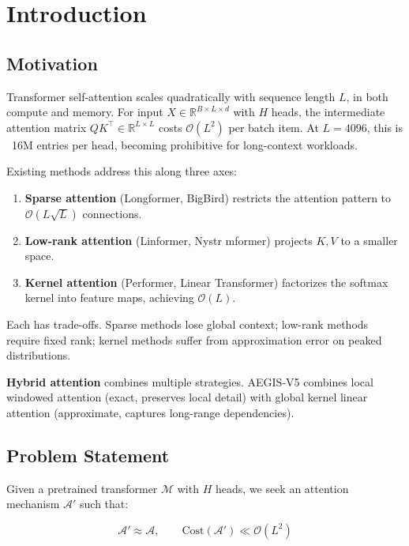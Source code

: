 \section{Introduction}

\subsection{Motivation}

Transformer self-attention scales quadratically with sequence length $L$, 
in both compute and memory. For input $X \in \mathbb{R}^{B \times L \times d}$ 
with $H$ heads, the intermediate attention matrix $Q K^\top \in \mathbb{R}^{L \times L}$ 
costs $\mathcal{O}(L^2)$ per batch item. At $L = 4096$, this is ~16M 
entries per head, becoming prohibitive for long-context workloads.

Existing methods address this along three axes:

\begin{enumerate}
\item \textbf{Sparse attention} (Longformer, BigBird) restricts the attention
  pattern to $\mathcal{O}(L \sqrt{L})$ connections.
\item \textbf{Low-rank attention} (Linformer, Nystr mformer) projects $K, V$ to a
  smaller space.
\item \textbf{Kernel attention} (Performer, Linear Transformer) factorizes the
  softmax kernel into feature maps, achieving $\mathcal{O}(L)$.

\end{enumerate}
Each has trade-offs. Sparse methods lose global context; low-rank methods 
require fixed rank; kernel methods suffer from approximation error on 
peaked distributions.

\textbf{Hybrid attention} combines multiple strategies. AEGIS-V5 combines local 
windowed attention (exact, preserves local detail) with global kernel 
linear attention (approximate, captures long-range dependencies).

\subsection{Problem Statement}

Given a pretrained transformer $\mathcal{M}$ with $H$ heads, we seek an 
attention mechanism $\mathcal{A}'$ such that:

\[
\mathcal{A}' \approx \mathcal{A}, \qquad
\text{Cost}(\mathcal{A}') \ll \mathcal{O}(L^2)
\]

